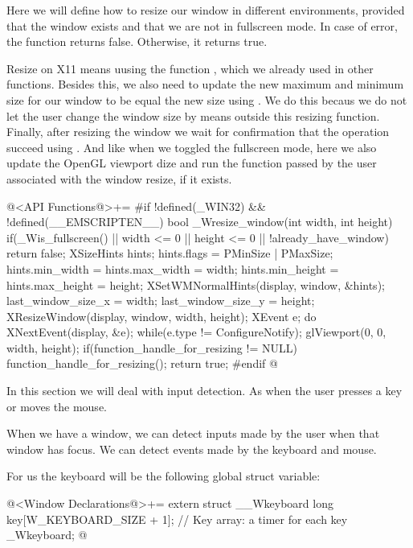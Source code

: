 
Here we will define how to resize our window in different
environments, provided that the window exists and that we are not in
fullscreen mode. In case of error, the function returns
false. Otherwise, it returns true.


Resize on X11 means uusing the function ,
which we already used in other functions. Besides this, we also need
to update the new maximum and minimum size for our window to be equal
the new size using . We do this becaus
we do not let the user change the window size by means outside this
resizing function. Finally, after resizing the window we wait for
confirmation that the operation succeed
using . And like when we toggled the fullscreen
mode, here we also update the OpenGL viewport dize and run the
function passed by the user associated with the window resize, if it
exists.

\iniciocodigo
@<API Functions@>+=
#if !defined(_WIN32) && !defined(__EMSCRIPTEN__)
bool _Wresize_window(int width, int height){
  if(_Wis_fullscreen() || width <= 0 || height <= 0 || !already_have_window)
    return false;
  {
    XSizeHints hints;
    hints.flags = PMinSize | PMaxSize;
    hints.min_width = hints.max_width = width;
    hints.min_height = hints.max_height = height;
    XSetWMNormalHints(display, window, &hints);
  }
  last_window_size_x = width;
  last_window_size_y = height;
  XResizeWindow(display, window, width, height);
  {
    XEvent e;
    do{
      XNextEvent(display, &e);
    } while(e.type != ConfigureNotify);
  }
  glViewport(0, 0, width, height);
  if(function_handle_for_resizing != NULL)
    function_handle_for_resizing();
  return true;
}
#endif
@



In this section we will deal with input detection. As when the user
presses a key or moves the mouse.


When we have a window, we can detect inputs made by the user when that
window has focus. We can detect events made by the keyboard and mouse.

For us the keyboard will be the following global struct variable:

\iniciocodigo
@<Window Declarations@>+=
extern struct __Wkeyboard{
  long key[W_KEYBOARD_SIZE + 1]; // Key array: a timer for each key
} _Wkeyboard;
@
\fimcodigo

